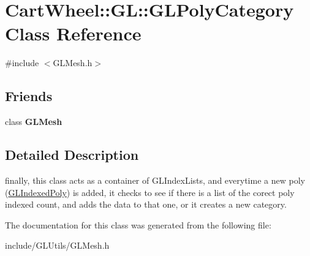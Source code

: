 \hypertarget{classCartWheel_1_1GL_1_1GLPolyCategory}{
\section{CartWheel::GL::GLPolyCategory Class Reference}
\label{classCartWheel_1_1GL_1_1GLPolyCategory}
}


{\ttfamily \#include $<$GLMesh.h$>$}

\subsection*{Friends}
\begin{DoxyCompactItemize}
\item 
\hypertarget{classCartWheel_1_1GL_1_1GLPolyCategory_a7ad5c94227dd02947e02998b7eaaf5d9}{
class {\bfseries GLMesh}}
\label{classCartWheel_1_1GL_1_1GLPolyCategory_a7ad5c94227dd02947e02998b7eaaf5d9}

\end{DoxyCompactItemize}


\subsection{Detailed Description}
finally, this class acts as a container of GLIndexLists, and everytime a new poly (\hyperlink{classCartWheel_1_1GL_1_1GLIndexedPoly}{GLIndexedPoly}) is added, it checks to see if there is a list of the corect poly indexed count, and adds the data to that one, or it creates a new category. 

The documentation for this class was generated from the following file:\begin{DoxyCompactItemize}
\item 
include/GLUtils/GLMesh.h\end{DoxyCompactItemize}
